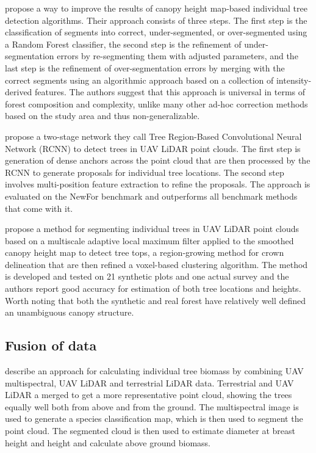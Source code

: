 \citet{lisiewiczCorrectingResultsCHMBased2022} propose a way to improve the results of canopy height map-based individual tree detection algorithms.
Their approach consists of three steps.
The first step is the classification of segments into correct, under-segmented, or over-segmented using a Random Forest classifier, the second step is the refinement of under-segmentation errors by re-segmenting them with adjusted parameters, and the last step is the refinement of over-segmentation errors by merging with the correct segments using an algorithmic approach based on a collection of intensity-derived features.
The authors suggest that this approach is universal in terms of forest composition and complexity, unlike many other ad-hoc correction methods based on the study area and thus non-generalizable.

\citet{wangAutomaticDetectionIndividual2023} propose a two-stage network they call Tree Region-Based Convolutional Neural Network (RCNN) to detect trees in UAV LiDAR point clouds.
The first step is generation of dense anchors across the point cloud that are then processed by the RCNN to generate proposals for individual tree locations.
The second step involves multi-position feature extraction to refine the proposals.
The approach is evaluated on the NewFor benchmark \citep{eysnAlpineITDBenchmark2015} and outperforms all benchmark methods that come with it.

\citet{fuIndividualTreeSegmentationUAV2024} propose a method for segmenting individual trees in UAV LiDAR point clouds based on a multiscale adaptive local maximum filter applied to the smoothed canopy height map to detect tree tops, a region-growing method for crown delineation that are then refined a voxel-based clustering algorithm.
The method is developed and tested on 21 synthetic plots and one actual survey and the authors report good accuracy for estimation of both tree locations and heights.
Worth noting that both the synthetic and real forest have relatively well defined an unambiguous canopy structure.

\subsection{Fusion of data}

\citet{lianBiomassCalculationsIndividual2022} describe an approach for calculating individual tree biomass by combining UAV multispectral, UAV LiDAR and terrestrial LiDAR data.
Terrestrial and UAV LiDAR a merged to get a more representative point cloud, showing the trees equally well both from above and from the ground.
The multispectral image is used to generate a species classification map, which is then used to segment the point cloud.
The segmented cloud is then used to estimate diameter at breast height and height and calculate above ground biomass.

